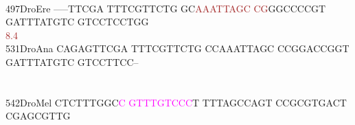 \documentclass[11pt,twoside,reqno,a4paper]{article}
\begin{document}
{\hspace*{4\charwidth}\hspace*{7\charwidth}\hspace*{1\charwidth}\hspace*{1\charwidth}\hspace*{1\charwidth}\hspace*{1\charwidth}\hspace*{1\charwidth}\hspace*{1\charwidth}\\
497\hspace*{1\charwidth}DroEre	-----TTCGA	TTTCGTTCTG	GC\textcolor{brown}{A}\textcolor{brown}{A}\textcolor{brown}{A}\textcolor{brown}{T}\textcolor{brown}{T}\textcolor{brown}{A}\textcolor{brown}{G}\textcolor{brown}{C}	\textcolor{brown}{C}\textcolor{brown}{G}GGCCCCGT	GATTTATGTC	GTCCTCCTGG	\\
\hspace*{4\charwidth}\hspace*{7\charwidth}\hspace*{1\charwidth}\hspace*{1\charwidth}\hspace*{22\charwidth}\textcolor{brown}{8.4}\hspace*{1\charwidth}\hspace*{1\charwidth}\hspace*{1\charwidth}\hspace*{1\charwidth}\\
531\hspace*{1\charwidth}DroAna	CAGAGTTCGA	TTTCGTTCTG	CCAAATTAGC	CCGGACCGGT	GATTTATGTC	GTCCTTCC--	\\
\hspace*{4\charwidth}\hspace*{7\charwidth}\hspace*{1\charwidth}\hspace*{1\charwidth}\hspace*{1\charwidth}\hspace*{1\charwidth}\hspace*{1\charwidth}\hspace*{1\charwidth}\\
\\
542\hspace*{1\charwidth}DroMel	CTCTTTGGC\textcolor{magenta}{C}	\textcolor{magenta}{G}\textcolor{magenta}{T}\textcolor{magenta}{T}\textcolor{magenta}{T}\textcolor{magenta}{G}\textcolor{magenta}{T}\textcolor{magenta}{C}\textcolor{magenta}{C}\textcolor{magenta}{C}T	TTTAGCCAGT	CCGCGTGACT	CGAGCGTTG\\
}
\end{document}
